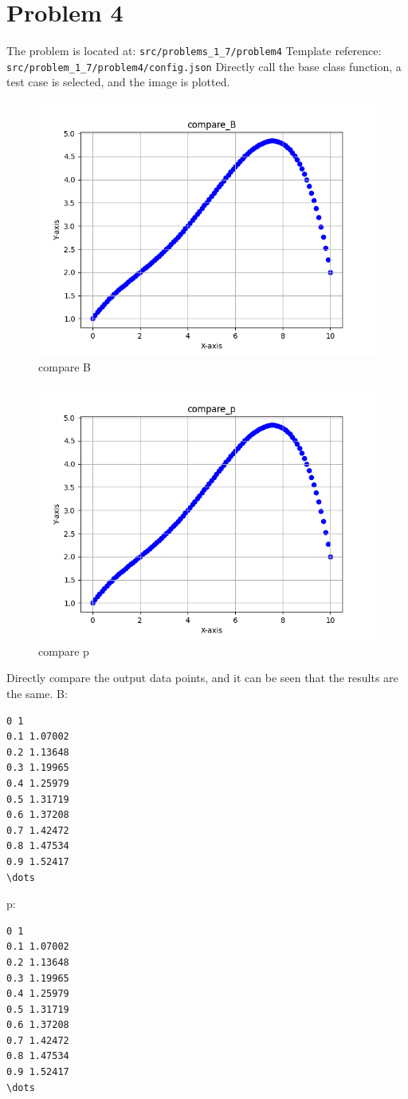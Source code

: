 \documentclass[a4paper]{article}
\begin{document}
\section*{Problem 4}
The problem is located at: \texttt{src/problems\_1\_7/problem4}
Template reference: \texttt{src/problem\_1\_7/problem4/config.json}
Directly call the base class function, a test case is selected, and the image is plotted.
\begin{figure}[H] 
    \centering
    \includegraphics{../figure/compare_B.png} 
    \caption{compare B} 
\end{figure}

\begin{figure}[H] 
    \centering
    \includegraphics{../figure/compare_p.png} 
    \caption{compare p} 
\end{figure}
Directly compare the output data points, and it can be seen that the results are the same.
B:
\begin{verbatim}
0 1
0.1 1.07002
0.2 1.13648
0.3 1.19965
0.4 1.25979
0.5 1.31719
0.6 1.37208
0.7 1.42472
0.8 1.47534
0.9 1.52417
\dots
\end{verbatim}
p:
\begin{verbatim}
0 1
0.1 1.07002
0.2 1.13648
0.3 1.19965
0.4 1.25979
0.5 1.31719
0.6 1.37208
0.7 1.42472
0.8 1.47534
0.9 1.52417
\dots
\end{verbatim}
\end{document}
